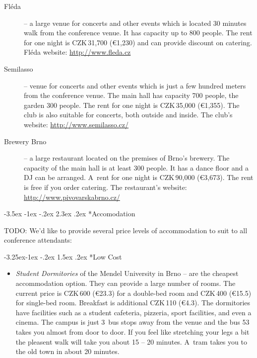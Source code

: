 \documentclass[10pt,a4paper]{article}
\makeatletter
\renewcommand\section{%
\@startsection{section}{1}{\z@}%
              {-3.5ex \@plus -1ex \@minus -.2ex}%
              {2.3ex \@plus.2ex}%
              {\color{kdelight}\sffamily\LARGE\bfseries}}
\renewcommand\subsection{%
\@startsection{subsection}{2}{\z@}%
              {-3.25ex\@plus -1ex \@minus -.2ex}%
              {1.5ex \@plus .2ex}%
              {\color{kdelight}\sffamily\Large\bfseries}}
\makeatother
\begin{document}
\begin{description}
\item[\color{kdedarker} Fléda] -- a large venue for concerts and other events which is located
30 minutes walk from the conference venue. It has capacity up to 800 people.
The rent for one night is CZK\,31,700 (\euro{1,230}) and can provide discount
on catering. Fléda website: \url{http://www.fleda.cz}
\item[\color{kdedarker} Semilasso] -- venue for concerts and other events which is
just a few hundred meters from the conference venue. The main hall
has capacity 700 people, the garden 300 people. The rent for one night
is CZK\,35,000 (\euro{1,355}). The club is also suitable for concerts,
both outside and inside. The club's website:
\url{http://www.semilasso.cz/}
\item[\color{kdedarker} Brewery Brno] -- a large restaurant located on the premises of
Brno's brewery. The capacity of the main hall is at least 300 people.
It has a dance floor and a DJ can be arranged. A~rent for one night is
CZK\,90,000 (\euro{3,673}). The rent is free if you order catering. The
restaurant's website:
\url{http://www.pivovarskabrno.cz/}
\end{description}

\cleardoublepage

\section*{Accomodation}
TODO:
We'd like to provide several price levels of accommodation to suit to all conference attendants:

\subsection*{Low Cost}
\begin{itemize}
\item \emph{Student Dormitories} of the Mendel University in Brno -- 
are the cheapest accommodation option. They can provide a
large number of rooms. The current price is CZK\,600 (\euro{23.3}) for a
double-bed room and CZK\,400 (\euro{15.5}) for single-bed room. Breakfast is additional
CZK\,110 (\euro{4.3}). The dormitories have facilities
such as a student cafeteria, pizzeria, sport facilities, and even a
cinema. The campus is just 3~bus stops away from the venue and the bus
53 takes you almost from door to door. If you feel like stretching your
legs a bit the pleasent walk will take you about 15 -- 20 minutes. A~tram
takes you to the old town in about 20 minutes.
\end{itemize}
\end{document}
